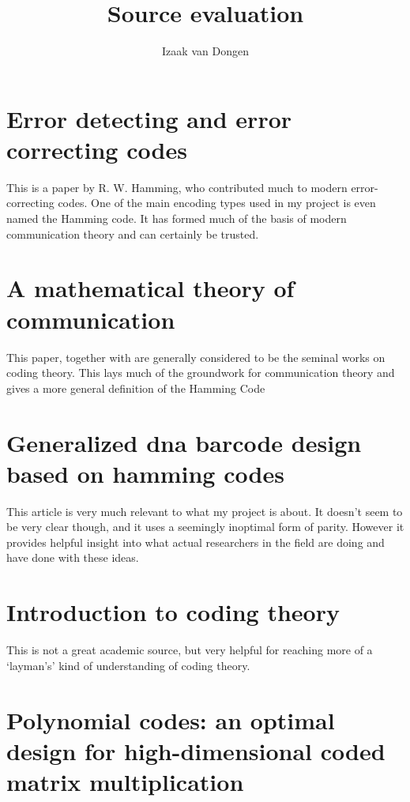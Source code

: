 \documentclass{article}
\title{Source evaluation}
\author{Izaak van Dongen}
\begin{document}
    \maketitle

    \section{Error detecting and error correcting codes \citep*{Codes1950Hamming}}

    This is a paper by R. W. Hamming, who contributed much to modern
    error-correcting codes. One of the main encoding types used in my project
    is even named the Hamming code. It has formed much of the basis of modern
    communication theory and can certainly be trusted.

    \section{A mathematical theory of communication \citep*{Communication1948Shannon}}

    This paper, together with \citep*{Codes1950Hamming} are generally considered
    to be the seminal works on coding theory. This lays much of the groundwork
    for communication theory and gives a more general definition of the Hamming
    Code

    \section{Generalized dna barcode design based on hamming codes \citep*{HammingBarcodes2012BystrykhLeonid}}

    This article is very much relevant to what my project is about. It doesn't
    seem to be very clear though, and it uses a seemingly inoptimal form of
    parity. However it provides helpful insight into what actual researchers in
    the field are doing and have done with these ideas.

    \section{Introduction to coding theory \citep*{CodeIntro2010Guruswami}}

    This is not a great academic source, but very helpful for reaching more of
    a `layman's' kind of understanding of coding theory.

    \section{Polynomial codes: an optimal design for high-dimensional coded matrix multiplication \citep*{PolynomialCodes2017MaddahAvestimehr}}
\end{document}
